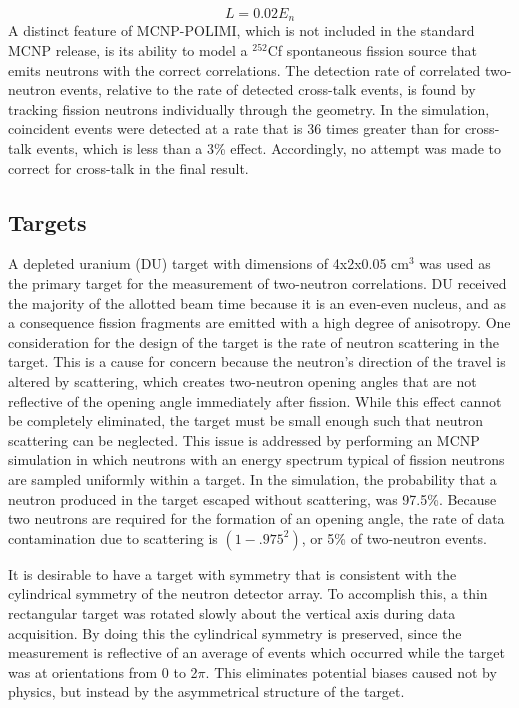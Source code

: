 \begin{displaymath}
L = 0.02 E_n
\end{displaymath}
A distinct feature of MCNP-POLIMI, which is not included in the standard MCNP release, is its ability to model a $^{252}$Cf spontaneous fission source that emits neutrons with the correct correlations.
The detection rate of correlated two-neutron events, relative to the rate of detected cross-talk events, is found by tracking fission neutrons individually through the geometry.
In the simulation, coincident events were detected at a rate that is 36 times greater than for cross-talk events, which is less than a 3\% effect.
Accordingly, no attempt was made to correct for cross-talk in the final result.

\subsection{Targets}
A depleted uranium (DU) target with dimensions of 4x2x0.05 $\text{cm}^3$ was used as the primary target for the measurement of two-neutron correlations.
DU received the majority of the allotted beam time because it is an even-even nucleus, and as a consequence fission fragments are emitted with a high degree of anisotropy.
One consideration for the design of the target is the rate of neutron scattering in the target.
This is a cause for concern because the neutron's direction of the travel is altered by scattering, which creates two-neutron opening angles that are not reflective of the opening angle immediately after fission.
While this effect cannot be completely eliminated, the target must be small enough such that neutron scattering can be neglected.
This issue is addressed by performing an MCNP simulation in which neutrons with an energy spectrum typical of fission neutrons are sampled uniformly within a target.
In the simulation, the probability that a neutron produced in the target escaped without scattering, was 97.5\%.
Because two neutrons are required for the formation of an opening angle, the rate of data contamination due to scattering is $(1-.975^2)$, or 5\% of two-neutron events.

It is desirable to have a target with symmetry that is consistent with the cylindrical symmetry of the neutron detector array.
To accomplish this, a thin rectangular target was rotated slowly about the vertical axis during data acquisition.
By doing this the cylindrical symmetry is preserved, since the measurement is reflective of an average of events which occurred while the target was at orientations from 0 to 2$\pi$.
This eliminates potential biases caused not by physics, but instead by the asymmetrical structure of the target.

